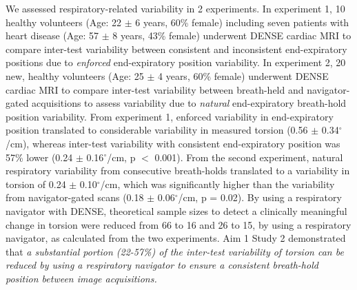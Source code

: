 	We assessed respiratory-related variability in 2 experiments. In experiment 1, 10 healthy volunteers (Age: 22 $\pm$ 6 years, 60\% female) including seven patients with heart disease (Age: 57 $\pm$ 8 years, 43\% female) underwent DENSE cardiac MRI to compare inter-test variability between consistent and inconsistent end-expiratory positions due to \textit{enforced} end-expiratory position variability. In experiment 2, 20 new, healthy volunteers (Age: 25 $\pm$ 4 years, 60\% female) underwent DENSE cardiac MRI to compare inter-test variability between breath-held and navigator-gated acquisitions to assess variability due to \textit{natural} end-expiratory breath-hold position variability. From experiment 1, enforced variability in end-expiratory position translated to considerable variability in measured torsion (0.56 $\pm$ 0.34$^{\circ}$/cm), whereas inter-test variability with consistent end-expiratory position was 57\% lower (0.24 $\pm$ 0.16$^{\circ}$/cm, p $<$ 0.001). From the second experiment, natural respiratory variability from consecutive breath-holds translated to a variability in torsion of 0.24 $\pm$ 0.10$^{\circ}$/cm, which was significantly higher than the variability from navigator-gated scans (0.18 $\pm$ 0.06$^{\circ}$/cm, p = 0.02). By using a respiratory navigator with DENSE, theoretical sample sizes to detect a clinically meaningful change in torsion were reduced from 66 to 16 and 26 to 15, by using a respiratory navigator, as calculated from the two experiments. Aim 1 Study 2 demonstrated that \textit{a substantial portion (22-57\%) of the inter-test variability of torsion can be reduced by using a respiratory navigator to ensure a consistent breath-hold position between image acquisitions.}

